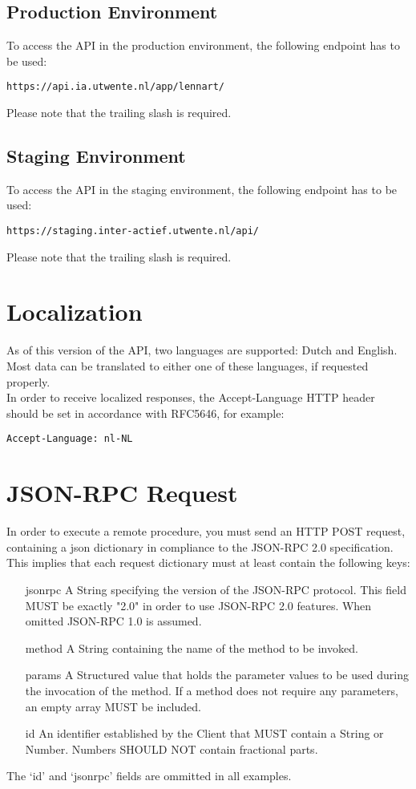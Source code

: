 \documentclass[a4paper]{scrreprt}
\begin{document}
\subsection{Production Environment}
To access the API in the production environment, the following endpoint has to be used:
\begin{lstlisting}
https://api.ia.utwente.nl/app/lennart/
\end{lstlisting}
Please note that the trailing slash is required.

\subsection{Staging Environment}
To access the API in the staging environment, the following endpoint has to be used:
\begin{lstlisting}
https://staging.inter-actief.utwente.nl/api/
\end{lstlisting}
Please note that the trailing slash is required.

\section{Localization}
As of this version of the API, two languages are supported: Dutch and English. Most data can be translated to either one of these languages, if requested properly.\\
In order to receive localized responses, the Accept-Language HTTP header should be set in accordance with RFC5646, for example:
\begin{lstlisting}
Accept-Language: nl-NL
\end{lstlisting}

\clearpage
\section{JSON-RPC Request}
In order to execute a remote procedure, you must send an HTTP POST request, containing a json dictionary in compliance to the JSON-RPC 2.0 specification\cite{jsonrpc}. This implies that each request dictionary must at least contain the following keys:

\begin{enumerate}
\item[jsonrpc] A String specifying the version of the JSON-RPC protocol. This field MUST be exactly "2.0" in order to use JSON-RPC 2.0 features. When omitted JSON-RPC 1.0 is assumed.
\item[method]
A String containing the name of the method to be invoked.
\item[params]
A Structured value that holds the parameter values to be used during the invocation of the method. If a method does not require any parameters, an empty array MUST be included.
\item[id]
An identifier established by the Client that MUST contain a String or Number.  Numbers SHOULD NOT contain fractional parts.
\end{enumerate}
The `id' and `jsonrpc' fields are ommitted in all examples.
\end{document}

